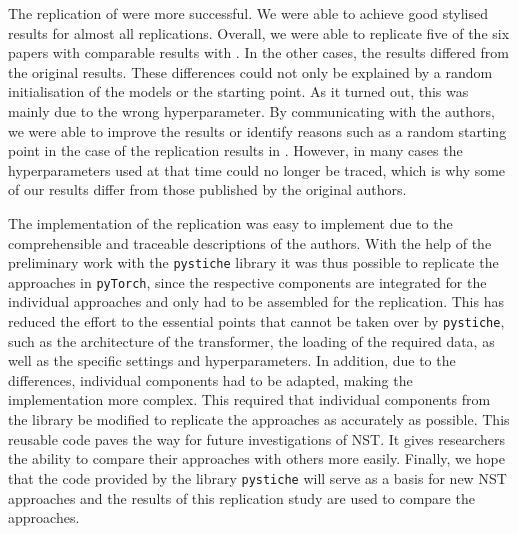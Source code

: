 The replication of \implementation{} were more successful. We were able to achieve good stylised results for almost all replications. Overall, we were able to replicate five of the six papers with comparable results with \implementation{}. In the other cases, the results differed from the original results. These differences could not only be explained by a random initialisation of the models or the starting point. As it turned out, this was mainly due to the wrong hyperparameter. By communicating with the authors, we were able to improve the results or identify reasons such as a random starting point in the case of the replication results in . However, in many cases the hyperparameters used at that time could no longer be traced, which is why some of our results differ from those published by the original authors.

The implementation of the replication was easy to implement due to the comprehensible and traceable descriptions of the authors. With the help of the preliminary work with the \texttt{pystiche} library it was thus possible to replicate the approaches in \texttt{pyTorch}, since the respective components are integrated for the individual approaches and only had to be assembled for the replication. This has reduced the effort to the essential points that cannot be taken over by \texttt{pystiche}, such as the architecture of the transformer, the loading of the required data, as well as the specific settings and hyperparameters. In addition, due to the differences, individual components had to be adapted, making the implementation more complex. This required that individual components from the library be modified to replicate the approaches as accurately as possible. This reusable code paves the way for future investigations of \gls{NST}. It gives researchers the ability to compare their approaches with others more easily. Finally, we hope that the code provided by the library \texttt{pystiche} will serve as a basis for new  \gls{NST} approaches and the results of this replication study are used to compare the approaches.








